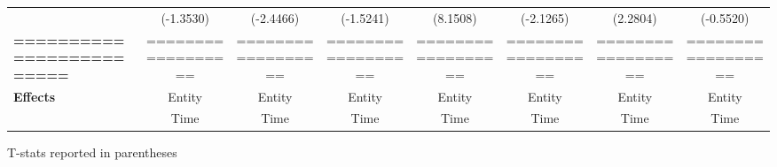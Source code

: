 \begin{center}
\begin{tabular}{lccccccc}
\textbf{ }                         &      (-1.3530)       &          (-2.4466)          &          (-1.5241)           &               (8.1508)              &            (-2.1265)             &           (2.2804)          &           (-0.5520)            \\
\textbf{=========================} &  ==================  &      ==================     &      ==================      &          ==================         &        ==================        &      ==================     &       ==================       \\
\textbf{Effects}                   &        Entity        &            Entity           &            Entity            &                Entity               &              Entity              &            Entity           &             Entity             \\
\textbf{}                          &         Time         &             Time            &             Time             &                 Time                &               Time               &             Time            &              Time              \\
\bottomrule
\end{tabular}
\end{center}

T-stats reported in parentheses